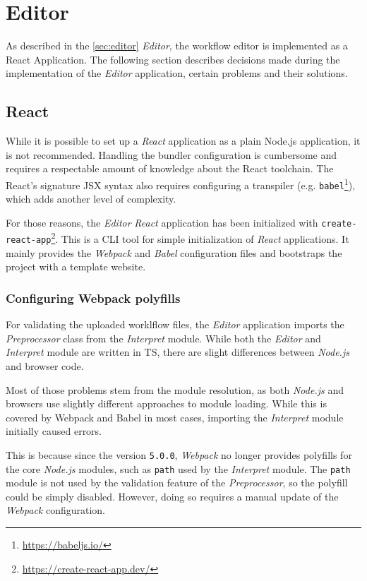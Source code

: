 \section{Editor}
As described in the \autoref{sec:editor} \textit{Editor}, the workflow editor is implemented as a React Application.
The following section describes decisions made during the implementation of the \textit{Editor} application,
certain problems and their solutions.

\subsection{React}
While it is possible to set up a \textit{React} application as a plain Node.js application, it is not recommended.
Handling the bundler configuration is cumbersome and requires a respectable amount of knowledge about the React toolchain.
The React's signature \acs{JSX} syntax also requires configuring a transpiler (e.g. \texttt{babel}\footnote{\url{https://babeljs.io/}}), which adds another level of complexity.

For those reasons, the \textit{Editor} \textit{React} application has been initialized with \texttt{create-react-app}\footnote{\url{https://create-react-app.dev/}}. 
This is a \ac{CLI} tool for simple initialization of \textit{React} applications.
It mainly provides the \textit{Webpack} and \textit{Babel} configuration files and bootstraps the project with a template website.

\subsubsection{Configuring Webpack polyfills}

For validating the uploaded worklflow files, the \textit{Editor} application imports the \textit{Preprocessor} class from the \textit{Interpret} module.
While both the \textit{Editor} and \textit{Interpret} module are written in \acl{TS}, there are slight differences between \textit{Node.js} and browser code.

Most of those problems stem from the module resolution, as both \textit{Node.js} and browsers use slightly different approaches to module loading.
While this is covered by Webpack and Babel in most cases, importing the \textit{Interpret} module initially caused errors.

This is because since the version \texttt{5.0.0}, \textit{Webpack} no longer provides polyfills for the core \textit{Node.js} modules, such as \texttt{path} used by the \textit{Interpret} module.
The \texttt{path} module is not used by the validation feature of the \textit{Preprocessor}, so the polyfill could be simply disabled.
However, doing so requires a manual update of the \textit{Webpack} configuration.

